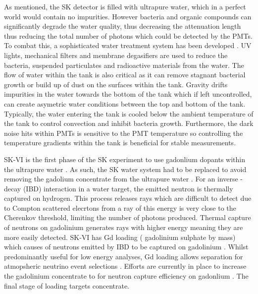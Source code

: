 As mentioned, the SK detector is filled with ultrapure water, which in a perfect world would contain no impurities. However bacteria and organic compounds can significantly degrade the water quality, thus decreasing the attenuation length thus reducing the total number of photons which could be detected by the PMTs. To combat this, a sophisticated water treatment system has been developed \cite{Fukuda2003-ly, Nakano2020-sb}. UV lights, mechanical filters and membrane degasifiers are used to reduce the bacteria, suspended particulates and radioactive materials from the water. The flow of water within the tank is also critical as it can remove stagnant bacterial growth or build up of dust on the surfaces within the tank. Gravity drifts impurities in the water towards the bottom of the tank which if left uncontrolled, can create asymetric water conditions between the top and bottom of the tank.
Typically, the water entering the tank is cooled below the ambient temperature of the tank to control convection and inhibit bacteria growth. Furthermore, the dark noise hits within PMTs is sensitive to the PMT temperature \cite{HamamatsuPMT} so controlling the temperature gradients within the tank is beneficial for stable measurements.

SK-VI is the first phase of the SK experiment to use gadonlium dopants within the ultrapure water . As such, the SK water system had to be replaced to avoid removing the gadolium concentrate from the ultrapure water \cite{Abe2022-qq}. For an inverse \quickmath{\beta}-decay (IBD) interaction in a water target, the emitted neutron is thermally captured on hydrogen. This process releases  \quickmath{\gamma} rays which are difficult to detect due to Compton scattered elecrtons from a \quickmath{\gamma} ray of this energy is very close to the Cherenkov threshold, limiting the number of photons produced. Thermal capture of neutrons on gadolinium generates \quickmath{\gamma} rays with higher energy meaning they are more easily detected. SK-VI has  Gd loading ( gadolinium sulphate by mass) which causes  of neutrons emitted by IBD to be captured on gadolinium \cite{PhysRevLett.93.171101,Marti2020-le} . Whilst predominantly useful for low energy analyses, Gd loading allows \quickmath{\nu/\bar{\nu}} separation for atmopsheric neutrino event selections \cite{Marti2019-gu}. Efforts are currently in place to increase the gadolinium concentrate to  for  neutron capture efficiency on gadonlium . The final stage of loading targets  concentrate.

